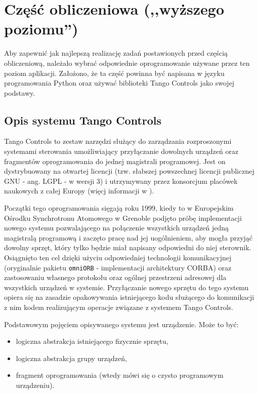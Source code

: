 \section{Część obliczeniowa (,,wyższego poziomu'')}
\label{sec:czesc-wyzsza}

Aby zapewnić jak najlepszą realizację zadań postawionych przed częścią obliczeniową, należało wybrać odpowiednie oprogramowanie używane przez ten poziom aplikacji. Założono, że ta część powinna być napisana w języku programowania Python oraz używać biblioteki Tango Controls jako swojej podstawy.


\subsection{Opis systemu Tango Controls}
\label{sub:czesc-wyzsza-tango}

Tango Controls to zestaw narzędzi służący do zarządzania rozproszonymi systemami sterowania umożliwiający przyłączanie dowolnych urządzeń oraz fragmentów oprogramowania do jednej magistrali programowej. Jest on dystrybuowany na otwartej licencji (tzw. słabszej powszechnej licencji publicznej GNU - ang. LGPL - w wersji 3) i utrzymywany przez konsorcjum placówek naukowych z całej Europy (więcj informacji w \cite{TangoWebsite}).

Początki tego oprogramowania sięgają roku 1999, kiedy to w Europejskim Ośrodku Synchrotronu Atomowego w Grenoble podjęto próbę implementacji nowego systemu pozwalającego na połączenie wszystkich urządzeń jedną magistralą programową i zaczęto pracę nad jej uogólnieniem, aby mogła przyjąć dowolny sprzęt, który tylko będzie miał napisany odpowiedni do niej sterownik. Osiągnięto ten cel dzięki użyciu odpowiedniej technologii komunikacyjnej (oryginalnie pakietu \texttt{omniORB} - implementacji architektury CORBA) oraz zastosowaniu własnego protokołu oraz ogólnej przestrzeni adresowej dla wszystkich urządzeń w systemie. Przyłączanie nowego sprzętu do tego systemu opiera się na zasadzie opakowywania istniejącego kodu służącego do komunikacji z nim kodem realizującym operacje związane z systemem Tango Controls.

Podstawowym pojęciem opisywanego systemu jest urządzenie. Może to być:
\begin{itemize}
    \item logiczna abstrakcja istniejącego fizycznie sprzętu,
    \item logiczna abstrakcja grupy urządzeń,
    \item fragment oprogramowania (wtedy mówi się o czysto programowym urządzeniu).
\end{itemize}

